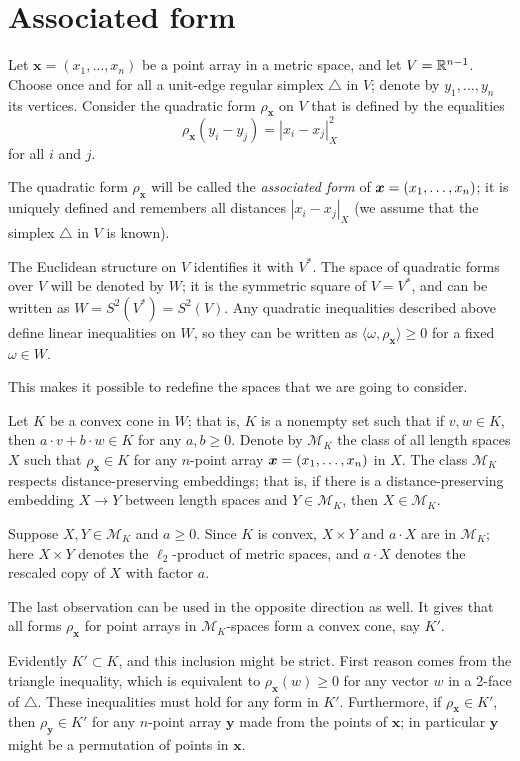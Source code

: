 \documentclass[a4paper,10pt]{article}
\begin{document}
\section{Associated form}\label{Associated form}

Let $\bm{x}=(x_1,\dots,x_n)$ be a point array in a metric space, and let $V\z=\RR^{n-1}$.
Choose once and for all a unit-edge regular simplex $\triangle$ in $V$; denote by $y_1,\dots,y_n$ its vertices.
Consider the quadratic form $\rho_{\bm{x}}$ on $V$ that is defined by the equalities
\[\rho_{\bm{x}}(y_i-y_j)=|x_i-x_j|^2_X\]
for all $i$ and $j$.

The quadratic form $\rho_{\bm{x}}$ will be called the \emph{associated form} of $\bm{x}=(x_1,\z\dots,x_n)$;
it is uniquely defined and remembers all distances $|x_i-x_j|_X$
(we assume that the simplex $\triangle$ in $V$ is known).

The Euclidean structure on $V$ identifies it with $V^*$.
The space of quadratic forms over $V$ will be denoted by $W$;
it is the symmetric square of $V=V^*$, and can be written as $W=S^2(V^*)=S^2(V)$.
Any quadratic inequalities described above define linear inequalities on $W$, so they can be written as $\langle\omega,\rho_{\bm{x}}\rangle\ge 0$ for a fixed $\omega\in W$.

This makes it possible to redefine the spaces that we are going to consider.

Let $K$ be a convex cone in $W$;
that is, $K$ is a nonempty set such that if $v,w\in K$, then $a\cdot v+b\cdot w\in K$ for any $a,b\ge0$.
Denote by $\mathcal{M}_K$ the class of all length spaces $X$ such that
$\rho_{\bm{x}}\in K$ for any $n$-point array $\bm{x}\z=(x_1,\dots,x_n)$ in $X$.
The class $\mathcal{M}_K$ respects distance-preserving embeddings; that is,
if there is a distance-preserving embedding $X\to Y$ between length spaces and $Y \in  \mathcal{M}_K$, then $X\in \mathcal{M}_K$.

Suppose $X,Y\in  \mathcal{M}_K$ and $a\ge 0$.
Since $K$ is convex,  $X\times Y$ and $a\cdot X$ are in $\mathcal{M}_K$;
here $X\times Y$ denotes the $\ell_2$-product of metric spaces, and
$a\cdot X$ denotes the rescaled copy of $X$ with factor $a$.

The last observation can be used in the opposite direction as well.
It gives that all forms $\rho_{\bm{x}}$ for point arrays in $\mathcal{M}_K$-spaces form a convex cone, say $K'$.

Evidently $K'\subset K$, and this inclusion might be strict.
First reason comes from the triangle inequality, which is equivalent to $\rho_{\bm{x}}(w)\ge 0$ for any vector $w$ in a 2-face of $\triangle$.
These inequalities must hold for any form in $K'$.
Furthermore, if $\rho_{\bm{x}}\in K'$, then $\rho_{\bm{y}}\in K'$ for any $n$-point array $\bm{y}$ made from the points of $\bm{x}$; in particular $\bm{y}$ might be a permutation of points in $\bm{x}$.
\end{document}
